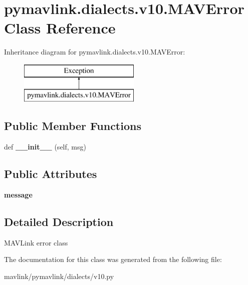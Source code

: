 \hypertarget{classpymavlink_1_1dialects_1_1v10_1_1MAVError}{}\section{pymavlink.\+dialects.\+v10.\+M\+A\+V\+Error Class Reference}
\label{classpymavlink_1_1dialects_1_1v10_1_1MAVError}
Inheritance diagram for pymavlink.\+dialects.\+v10.\+M\+A\+V\+Error\+:\begin{figure}[H]
\begin{center}
\leavevmode
\includegraphics[height=2.000000cm]{classpymavlink_1_1dialects_1_1v10_1_1MAVError}
\end{center}
\end{figure}
\subsection*{Public Member Functions}
\begin{DoxyCompactItemize}
\item 
\mbox{\label{classpymavlink_1_1dialects_1_1v10_1_1MAVError_aa1c2e861500c023b4a06996ead6521ff}} 
def {\bfseries \+\_\+\+\_\+init\+\_\+\+\_\+} (self, msg)
\end{DoxyCompactItemize}
\subsection*{Public Attributes}
\begin{DoxyCompactItemize}
\item 
\mbox{\label{classpymavlink_1_1dialects_1_1v10_1_1MAVError_ad06f0deb722577b484b8b654cd671a23}} 
{\bfseries message}
\end{DoxyCompactItemize}


\subsection{Detailed Description}
\begin{DoxyVerb}MAVLink error class\end{DoxyVerb}
 

The documentation for this class was generated from the following file\+:\begin{DoxyCompactItemize}
\item 
mavlink/pymavlink/dialects/v10.\+py\end{DoxyCompactItemize}
